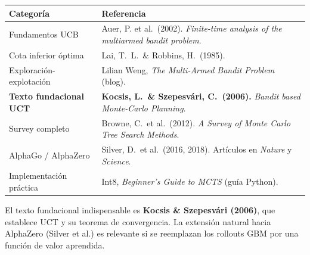 \documentclass[11pt, a4paper]{article}
\begin{document}
\begin{center}
\renewcommand{\arraystretch}{1.4}
\begin{tabular}{p{3.5cm} p{10cm}}
  \toprule
  \textbf{Categoría} & \textbf{Referencia} \\
  \midrule
  Fundamentos UCB & Auer, P. et al.\ (2002). \emph{Finite-time analysis of the multiarmed bandit problem}. \\
  Cota inferior óptima & Lai, T.\ L.\ \& Robbins, H.\ (1985). \\
  Exploración-explotación & Lilian Weng, \emph{The Multi-Armed Bandit Problem} (blog). \\
  \textbf{Texto fundacional UCT} & \textbf{Kocsis, L.\ \& Szepesvári, C.\ (2006).} \emph{Bandit based Monte-Carlo Planning}. \\
  Survey completo & Browne, C.\ et al.\ (2012). \emph{A Survey of Monte Carlo Tree Search Methods}. \\
  AlphaGo / AlphaZero & Silver, D.\ et al.\ (2016, 2018). Artículos en \emph{Nature} y \emph{Science}. \\
  Implementación práctica & Int8, \emph{Beginner's Guide to MCTS} (guía Python). \\
  \bottomrule
\end{tabular}
\end{center}

\vspace{1em}
El texto fundacional indispensable es \textbf{Kocsis \& Szepesvári (2006)}, que establece UCT y su teorema de convergencia. La extensión natural hacia AlphaZero (Silver et al.) es relevante si se reemplazan los rollouts GBM por una función de valor aprendida.
\end{document}
